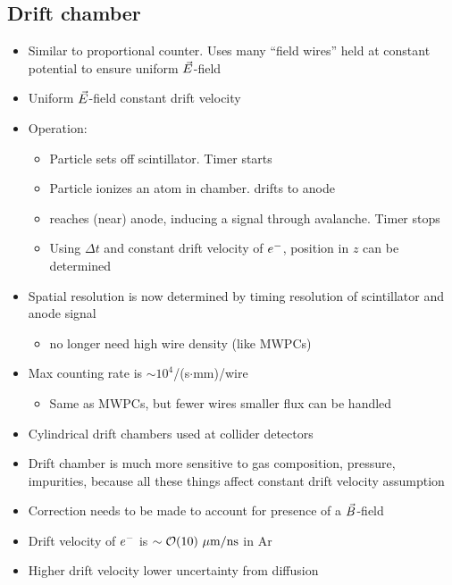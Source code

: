 \subsection{Drift chamber}
\begin{itemize}
  \item Similar to proportional counter. Uses many ``field wires'' held at constant potential to ensure uniform $\vec{E}$-field
  \item Uniform $\vec{E}$-field \thus constant drift velocity
  \item Operation:
  \begin{itemize}
    \item Particle sets off scintillator. Timer starts
    \item Particle ionizes an atom in chamber. \el drifts to anode
    \item \el reaches (near) anode, inducing a signal through avalanche. Timer stops
    \item Using $\Delta t$ and constant drift velocity of $e^{-}$, position in $z$ can be determined
  \end{itemize}
  \item Spatial resolution is now determined by timing resolution of scintillator and anode signal
  \begin{itemize}
    \item \thus no longer need high wire density (like MWPCs)
  \end{itemize}
  \item Max counting rate is $\sim 10^4$/(s$\cdot$mm)/wire
  \begin{itemize}
    \item Same as MWPCs, but fewer wires \thus smaller flux can be handled
  \end{itemize}
  \item Cylindrical drift chambers used at collider detectors
  \item Drift chamber is much more sensitive to gas composition, pressure, impurities, because all these things affect constant drift velocity assumption
  \item Correction needs to be made to account for presence of a $\vec{B}$-field
  \item Drift velocity of $e^{-}$ is $\sim \mathcal{O}(10)~\mu\text{m}/\text{ns}$ in Ar
  \item Higher drift velocity \thus lower uncertainty from diffusion
\end{itemize}

